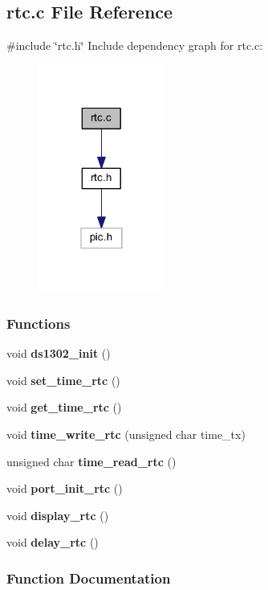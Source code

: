 \subsection{rtc.\+c File Reference}
\label{a00041}
{\ttfamily \#include \char`\"{}rtc.\+h\char`\"{}}\newline
Include dependency graph for rtc.\+c\+:
\nopagebreak
\begin{figure}[H]
\begin{center}
\leavevmode
\includegraphics[width=118pt]{a00042}
\end{center}
\end{figure}
\subsubsection*{Functions}
\begin{DoxyCompactItemize}
\item 
void \textbf{ ds1302\+\_\+init} ()
\item 
void \textbf{ set\+\_\+time\+\_\+rtc} ()
\item 
void \textbf{ get\+\_\+time\+\_\+rtc} ()
\item 
void \textbf{ time\+\_\+write\+\_\+rtc} (unsigned char time\+\_\+tx)
\item 
unsigned char \textbf{ time\+\_\+read\+\_\+rtc} ()
\item 
void \textbf{ port\+\_\+init\+\_\+rtc} ()
\item 
void \textbf{ display\+\_\+rtc} ()
\item 
void \textbf{ delay\+\_\+rtc} ()
\end{DoxyCompactItemize}


\subsubsection{Function Documentation}
\mbox{\label{a00041_a30a11d605a2fcfe8fc79c4f0a17a20cf}} 
